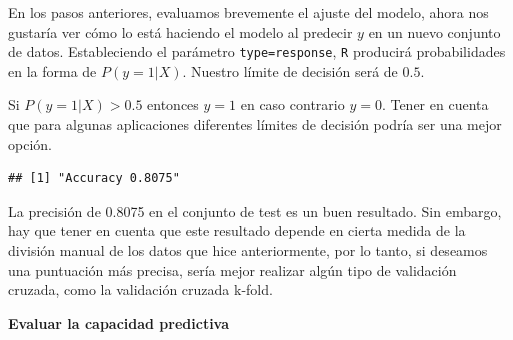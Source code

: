 \documentclass[]{book}
\newenvironment{Shaded}{\begin{snugshade}}{\end{snugshade}}
\newcommand{\KeywordTok}[1]{\textcolor[rgb]{0.13,0.29,0.53}{\textbf{#1}}}
\newcommand{\DataTypeTok}[1]{\textcolor[rgb]{0.13,0.29,0.53}{#1}}
\newcommand{\DecValTok}[1]{\textcolor[rgb]{0.00,0.00,0.81}{#1}}
\newcommand{\FloatTok}[1]{\textcolor[rgb]{0.00,0.00,0.81}{#1}}
\newcommand{\StringTok}[1]{\textcolor[rgb]{0.31,0.60,0.02}{#1}}
\newcommand{\OperatorTok}[1]{\textcolor[rgb]{0.81,0.36,0.00}{\textbf{#1}}}
\newcommand{\NormalTok}[1]{#1}
\begin{document}
En los pasos anteriores, evaluamos brevemente el ajuste del modelo,
ahora nos gustaría ver cómo lo está haciendo el modelo al predecir \(y\)
en un nuevo conjunto de datos. Estableciendo el parámetro
\texttt{type=\textquotesingle{}response\textquotesingle{}}, \texttt{R}
producirá probabilidades en la forma de \(P(y=1|X)\). Nuestro límite de
decisión será de \(0.5\).

Si \(P(y=1|X) > 0.5\) entonces \(y = 1\) en caso contrario \(y=0\).
Tener en cuenta que para algunas aplicaciones diferentes límites de
decisión podría ser una mejor opción.

\begin{Shaded}
\end{Shaded}

\begin{verbatim}
## [1] "Accuracy 0.8075"
\end{verbatim}

La precisión de 0.8075 en el conjunto de test es un buen resultado. Sin
embargo, hay que tener en cuenta que este resultado depende en cierta
medida de la división manual de los datos que hice anteriormente, por lo
tanto, si deseamos una puntuación más precisa, sería mejor realizar
algún tipo de validación cruzada, como la validación cruzada k-fold.

\textbf{Evaluar la capacidad predictiva}

\begin{Shaded}
\end{Shaded}
\end{document}
